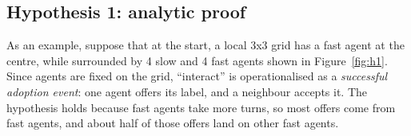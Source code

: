 \documentclass{article}
\begin{document}
\subsection*{Hypothesis 1: analytic proof}

As an example, suppose that at the start, a local 3x3 grid has a fast agent at the centre, while surrounded by 4 slow and 4 fast agents shown in Figure~\ref{fig:h1}. \\

Since agents are fixed on the grid, ``interact'' is operationalised as a \emph{successful adoption event}: one agent offers its label, and a neighbour accepts it. The hypothesis holds because fast agents take more turns, so most offers come from fast agents, and about half of those offers land on other fast agents. \\
\end{document}
